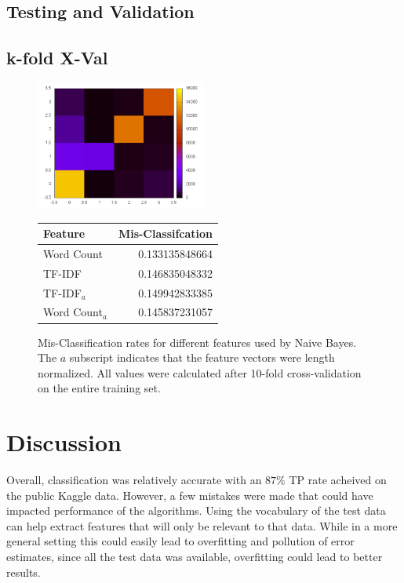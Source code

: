 \documentclass[10pt,twocolumn]{article}
\begin{document}
\subsection{Testing and Validation}

\subsection*{k-fold X-Val}

\begin{figure}
  \centering
  \includegraphics[width=0.5\textwidth]{./confusion.png}
  \label{confusion}
\end{figure}

\begin{figure}
  \centering
  \begin{tabular}{|l || r|}
  \hline
  Feature & Mis-Classifcation\\
  \hline
  Word Count     & 0.133135848664 \\
  TF-IDF         & 0.146835048332 \\
  TF-IDF$_a$     & 0.149942833385 \\
  Word Count$_a$ & 0.145837231057 \\
  \hline
  \end{tabular}
  \caption {Mis-Classification rates for different features used by Naive Bayes. The $a$ subscript indicates that the feature vectors were length normalized. All values were calculated after 10-fold cross-validation on the entire training set.}
\end{figure}


\section*{Discussion}

Overall, classification was relatively accurate with an $87\%$ TP rate acheived on the public Kaggle data. However, a few mistakes were made that could have impacted performance of the algorithms. Using the vocabulary of the test data can help extract features that will only be relevant to that data.  While in a more general setting this could easily lead to overfitting and pollution of error estimates, since all the test data was available, overfitting could lead to better results. 
\end{document}
